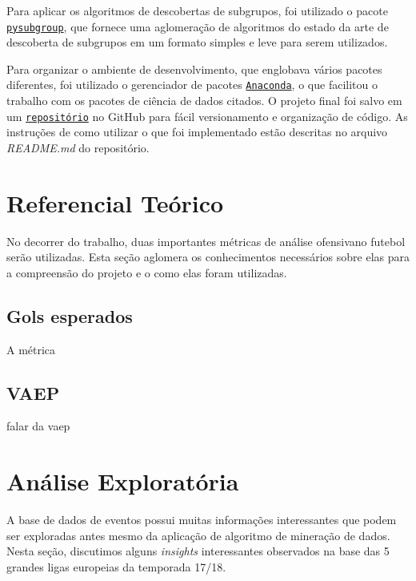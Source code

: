 \documentclass{article}
\begin{document}
Para aplicar os algoritmos de descobertas de subgrupos, foi utilizado o pacote
\href{https://pysubgroup.readthedocs.io/en/latest/}{\texttt{pysubgroup}}, que
fornece uma aglomeração de algoritmos do estado da arte de descoberta de
subgrupos em um formato simples e leve para serem utilizados.


Para organizar o ambiente de desenvolvimento, que englobava vários pacotes
diferentes, foi utilizado o gerenciador de pacotes
\href{https://www.anaconda.com/}{\texttt{Anaconda}}, o que facilitou o trabalho
com os pacotes de ciência de dados citados. O projeto final foi salvo em um
\href{https://github.com/lframosferreira/projeto-ad}{\texttt{repositório}}
no GitHub para fácil versionamento e organização de código. As instruções de
como
utilizar o que foi implementado estão descritas no arquivo \textit{README.md}
do repositório.

\section{Referencial Teórico}

No decorrer do trabalho, duas importantes métricas de análise ofensivano
futebol serão utilizadas. Esta seção
aglomera os conhecimentos necessários sobre elas para a compreensão do projeto
e o como elas foram utilizadas.

\subsection{Gols esperados}

A métrica

\subsection{VAEP}

falar da vaep \cite{vaep}

\section{Análise Exploratória}

A base de dados de eventos possui muitas informações interessantes que podem
ser exploradas antes mesmo da aplicação
de algoritmo de mineração de dados. Nesta seção, discutimos alguns
\textit{insights} interessantes observados na base das 5 grandes ligas
europeias da temporada 17/18.
\end{document}
